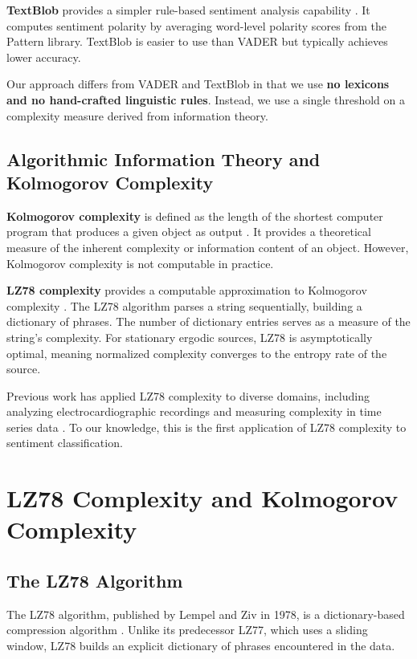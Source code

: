 \documentclass[11pt,letterpaper]{article}
\begin{document}
\textbf{TextBlob} provides a simpler rule-based sentiment analysis capability \cite{Loria2018}. It computes sentiment polarity by averaging word-level polarity scores from the Pattern library. TextBlob is easier to use than VADER but typically achieves lower accuracy.

Our approach differs from VADER and TextBlob in that we use \textbf{no lexicons and no hand-crafted linguistic rules}. Instead, we use a single threshold on a complexity measure derived from information theory.

\subsection{Algorithmic Information Theory and Kolmogorov Complexity}

\textbf{Kolmogorov complexity} is defined as the length of the shortest computer program that produces a given object as output \cite{Li2008}. It provides a theoretical measure of the inherent complexity or information content of an object. However, Kolmogorov complexity is not computable in practice.

\textbf{LZ78 complexity} provides a computable approximation to Kolmogorov complexity \cite{Ziv1978}. The LZ78 algorithm parses a string sequentially, building a dictionary of phrases. The number of dictionary entries serves as a measure of the string's complexity. For stationary ergodic sources, LZ78 is asymptotically optimal, meaning normalized complexity converges to the entropy rate of the source.

Previous work has applied LZ78 complexity to diverse domains, including analyzing electrocardiographic recordings \cite{Alexeenko2019} and measuring complexity in time series data \cite{InfoDynamics2019}. To our knowledge, this is the first application of LZ78 complexity to sentiment classification.

\section{LZ78 Complexity and Kolmogorov Complexity}

\subsection{The LZ78 Algorithm}

The LZ78 algorithm, published by Lempel and Ziv in 1978, is a dictionary-based compression algorithm \cite{Ziv1978}. Unlike its predecessor LZ77, which uses a sliding window, LZ78 builds an explicit dictionary of phrases encountered in the data.
\end{document}
